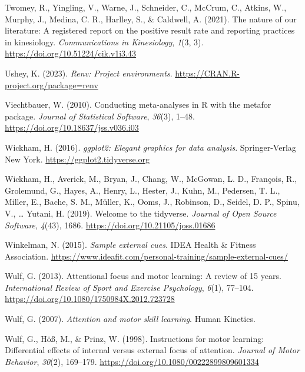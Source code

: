 \documentclass[
  11pt,
  doc, donotrepeattitle,floatsintext]{apa7}
\newlength{\cslhangindent}
\newlength{\cslentryspacingunit} %
\newenvironment{CSLReferences}[2] %
 {%
  \setlength{\parindent}{0pt}
  \ifodd #1
  \let\oldpar\par
  \def\par{\hangindent=\cslhangindent\oldpar}
  \fi
  \setlength{\parskip}{#2\cslentryspacingunit}
 }%
 {}
\begin{document}
\begin{CSLReferences}{1}{0}
\leavevmode{}%
Twomey, R., Yingling, V., Warne, J., Schneider, C., McCrum, C., Atkins, W., Murphy, J., Medina, C. R., Harlley, S., \& Caldwell, A. (2021). The nature of our literature: {A} registered report on the positive result rate and reporting practices in kinesiology. \emph{Communications in Kinesiology}, \emph{1}(3, 3). \url{https://doi.org/10.51224/cik.v1i3.43}

\leavevmode{}%
Ushey, K. (2023). \emph{Renv: Project environments}. \url{https://CRAN.R-project.org/package=renv}

\leavevmode{}%
Viechtbauer, W. (2010). Conducting meta-analyses in {R} with the {metafor} package. \emph{Journal of Statistical Software}, \emph{36}(3), 1--48. \url{https://doi.org/10.18637/jss.v036.i03}

\leavevmode{}%
Wickham, H. (2016). \emph{ggplot2: Elegant graphics for data analysis}. Springer-Verlag New York. \url{https://ggplot2.tidyverse.org}

\leavevmode{}%
Wickham, H., Averick, M., Bryan, J., Chang, W., McGowan, L. D., François, R., Grolemund, G., Hayes, A., Henry, L., Hester, J., Kuhn, M., Pedersen, T. L., Miller, E., Bache, S. M., Müller, K., Ooms, J., Robinson, D., Seidel, D. P., Spinu, V., \ldots{} Yutani, H. (2019). Welcome to the {tidyverse}. \emph{Journal of Open Source Software}, \emph{4}(43), 1686. \url{https://doi.org/10.21105/joss.01686}

\leavevmode{}%
Winkelman, N. (2015). \emph{Sample external cues}. {IDEA Health \& Fitness Association}. \url{https://www.ideafit.com/personal-training/sample-external-cues/}

\leavevmode{}%
Wulf, G. (2013). Attentional focus and motor learning: A review of 15 years. \emph{International Review of Sport and Exercise Psychology}, \emph{6}(1), 77--104. \url{https://doi.org/10.1080/1750984X.2012.723728}

\leavevmode{}%
Wulf, G. (2007). \emph{Attention and motor skill learning}. {Human Kinetics}.

\leavevmode{}%
Wulf, G., Höß, M., \& Prinz, W. (1998). Instructions for motor learning: {Differential} effects of internal versus external focus of attention. \emph{Journal of Motor Behavior}, \emph{30}(2), 169--179. \url{https://doi.org/10.1080/00222899809601334}


\end{CSLReferences}
\end{document}
